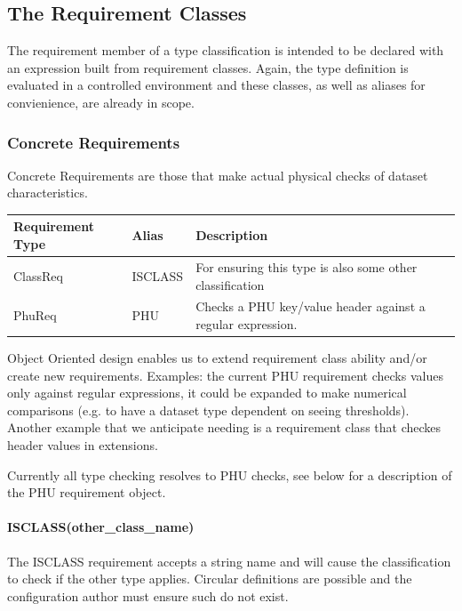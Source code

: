 \documentclass[letterpaper,10pt,english]{sphinxmanual}
\begin{document}
\subsection{The Requirement Classes}
\label{creatingAnAstroDataType:the-requirement-classes}
The requirement member of a type classification is intended to be declared
with an expression built from requirement classes.  Again, the type definition
is evaluated in a controlled environment and these classes, as well as aliases
for convienience, are already in scope.


\subsubsection{Concrete Requirements}
\label{creatingAnAstroDataType:concrete-requirements}
Concrete Requirements are those that make actual physical checks of dataset characteristics.

\begin{tabulary}{\linewidth}{|L|L|L|}
\hline
\textbf{
Requirement Type
} & \textbf{
Alias
} & \textbf{
Description
}\\
\hline

ClassReq
 & 
ISCLASS
 & 
For ensuring this type is also some other
classification
\\

PhuReq
 & 
PHU
 & 
Checks a PHU key/value header against a regular
expression.
\\
\hline
\end{tabulary}


Object Oriented design enables us to extend requirement class ability and/or create new
requirements.  Examples: the current PHU requirement checks values only against
regular expressions, it could be expanded to make numerical comparisons (e.g. to
have a dataset type dependent on seeing thresholds). Another example that we
anticipate needing is a requirement class that checkes header values in extensions.

Currently all type checking resolves to PHU checks, see below for
a description of the PHU requirement object.


\paragraph{ISCLASS(other\_class\_name)}
\label{creatingAnAstroDataType:isclass-other-class-name}
The ISCLASS requirement accepts a string name and will cause the classification to check
if the other type applies.  Circular definitions are possible and the configuration author
must ensure such do not exist.
\end{document}
